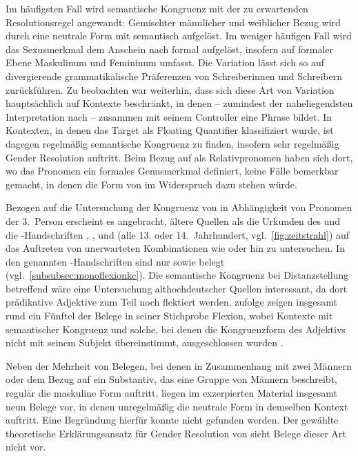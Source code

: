 Im häufigsten Fall wird semantische Kongruenz mit der zu erwartenden
Resolutionsregel angewandt: Gemischter männlicher und weiblicher Bezug wird
durch eine neutrale Form mit \mbox{} semantisch aufgelöst. Im weniger
häufigen Fall wird das Sexusmerkmal dem Anschein nach formal aufgelöst,
insofern  auf formaler Ebene Maskulinum und Femininum umfasst. Die
Variation lässt sich so auf divergierende grammatikalische Präferenzen von
Schreiberinnen und Schreibern zurück\-führen. Zu beobachten war weiterhin, dass
sich diese Art von Variation hauptsächlich auf Kontexte beschränkt, in denen
 -- zumindest der naheliegendsten Interpretation nach --
zusammen mit seinem Controller eine Phrase bildet. In Kontexten, in denen das
Target als Floating Quantifier klassifiziert wurde, ist dagegen regelmäßig
semantische Kongruenz zu finden, insofern sehr regelmäßig Gender Resolution
auftritt. Beim Bezug auf  als Relativpronomen haben sich dort, wo
das Pronomen ein formales Genusmerkmal definiert, keine Fälle bemerkbar
gemacht, in denen die Form von  im Widerspruch dazu stehen
würde.

Bezogen auf die Untersuchung der Kongruenz von  in Abhängigkeit
von Pro\-nomen der 3.~Person erscheint es angebracht, ältere Quellen als die
Urkunden des \CAO{} und die \citet{kc}-Handschriften
\citet{kc:B1}, \citet{kc:C1}, \citet{kc:K} und \citet{kc:VB} (alle 13. oder
14.~Jahrhundert, vgl.~\cref{fig:zeitstrahl}) auf das Auftreten von unerwarteten
Kombinationen wie  oder  hin zu untersuchen.
In den genannten \citet{kc}-Handschriften sind nur 
sowie  belegt (vgl.~\cref{subsubsec:monoflexionkc}). Die
semantische Kongruenz bei Distanz\-stellung betreffend wäre eine Untersuchung
althochdeutscher Quellen interessant, da dort prädikative Adjektive zum
Teil noch flektiert werden. \citet[310--311]{fleischer2007} zufolge zeigen
insgesamt rund ein Fünftel der Belege in seiner Stichprobe Flexion, wobei
Kontexte mit semantischer Kongruenz und solche, bei denen die Kongruenzform des
Adjektivs nicht mit seinem Subjekt übereinstimmt, ausgeschlossen wurden
\autocite[304]{fleischer2007}.

Neben der Mehrheit von Belegen, bei denen in Zusammenhang mit zwei Männern oder
dem Bezug auf ein Substantiv, das eine Gruppe von Männern beschreibt, regulär
die maskuline Form  auftritt, liegen im exzerpierten Material
insgesamt neun Belege vor, in denen unregelmäßig die neutrale Form
 in demselben Kontext auftritt. Eine Begründung hierfür konnte
nicht gefunden werden. Der gewählte theoretische Erklärungsansatz für Gender
Resolution von \citet{wechslerzlatic2003,wechsler2009} sieht Belege dieser Art
nicht vor.

